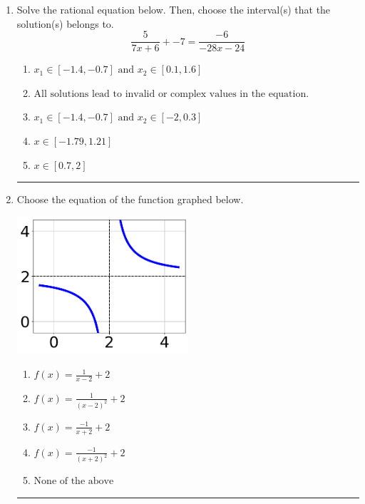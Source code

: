 \documentclass[14pt]{extbook}
\newcommand{\litem}[1]{\item#1\hspace*{-1cm}\rule{\textwidth}{0.4pt}}
\begin{document}
\begin{enumerate}
{\begin{enumerate}[label=\Alph*.]
\end{enumerate} }
\litem{
Solve the rational equation below. Then, choose the interval(s) that the solution(s) belongs to.\[ \frac{5}{7x + 6} + -7 = \frac{-6}{-28x -24} \]\begin{enumerate}[label=\Alph*.]
\item \( x_1 \in [-1.4, -0.7] \text{ and } x_2 \in [0.1,1.6] \)
\item \( \text{All solutions lead to invalid or complex values in the equation.} \)
\item \( x_1 \in [-1.4, -0.7] \text{ and } x_2 \in [-2,0.3] \)
\item \( x \in [-1.79,1.21] \)
\item \( x \in [0.7,2] \)

\end{enumerate} }
\litem{
Choose the equation of the function graphed below.
\begin{center}
    \includegraphics[width=0.5\textwidth]{../Figures/rationalGraphToEquationC.png}
\end{center}
\begin{enumerate}[label=\Alph*.]
\item \( f(x) = \frac{1}{x - 2} + 2 \)
\item \( f(x) = \frac{1}{(x - 2)^2} + 2 \)
\item \( f(x) = \frac{-1}{x + 2} + 2 \)
\item \( f(x) = \frac{-1}{(x + 2)^2} + 2 \)
\item \( \text{None of the above} \)


\end{enumerate}}
\end{enumerate}
\end{document}
